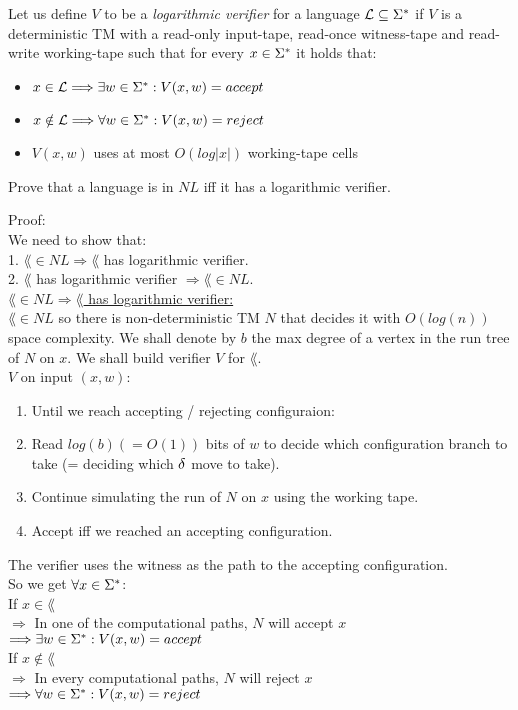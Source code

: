 Let us define $V$ to be a {\it logarithmic verifier} for a language $\mathcal{L} \subseteq \Sigma^*$ if $V$ is a
deterministic TM with a read-only input-tape, read-once witness-tape and
read-write working-tape such that for every $x \in \Sigma^*$ it holds that:
\begin{itemize}
    \item $x \in \mathcal{L} \Longrightarrow \exists w \in \Sigma^* : V (x, w) = accept$
    \item $x \notin \mathcal{L} \Longrightarrow \forall w \in \Sigma^* : V (x, w) = reject$
    \item $V(x, w)$ uses at most $O(log|x|)$ working-tape cells
\end{itemize}
Prove that a language is in $NL$ iff it has a logarithmic verifier.


Proof: \\
We need to show that: \\
1. $\lang \in NL \Rightarrow \lang$ has logarithmic verifier. \\
2. $\lang$ has logarithmic verifier $\Rightarrow \lang \in NL$. \\

\underline{$\lang \in NL \Rightarrow \lang$ has logarithmic verifier:} \\
$\lang \in NL$ so there is non-deterministic TM $N$ that decides it with $O(log(n))$ space complexity.
We shall denote by $b$ the max degree of a vertex in the run tree of $N$ on $x$.
We shall build verifier $V$ for $\lang$. \\
$V$ on input $(x, w)$:
\begin{enumerate}[1., itemsep=5pt]
    \item Until we reach accepting / rejecting configuraion:
    \item \qquad Read $log(b) (=O(1))$ bits of $w$ to decide which configuration branch to take (= deciding which $\delta$ move to take).
    \item \qquad Continue simulating the run of $N$ on $x$ using the working tape.
    \item Accept iff we reached an accepting configuration.
\end{enumerate}

The verifier uses the witness as the path to the accepting configuration. \\
So we get $\forall x \in \Sigma^*$: \\
If $x \in \lang$ \\
$\Longrightarrow$ In one of the computational paths, $N$ will accept $x$ \\
$\Longrightarrow \exists w \in \Sigma^* : V (x, w) = accept$ \\
If $x \notin \lang$ \\
$\Longrightarrow$ In every computational paths, $N$ will reject $x$ \\
$\Longrightarrow  \forall w \in \Sigma^* : V (x, w) = reject$ \\

